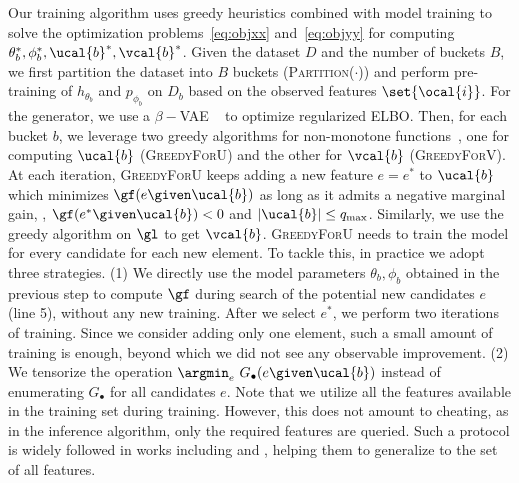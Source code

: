 \documentclass[letterpaper]{article}
\renewcommand{\cite}{\citep}
\begin{document}

Our training algorithm uses greedy heuristics combined with model training to solve the optimization problems~\eqref{eq:objxx} and~\eqref{eq:objyy} for computing $\theta_b ^*, \phi_b ^*, \ucal{b} ^*, \vcal{b}^*$. Given the dataset $D$ and the number of buckets $B$, we first partition the dataset into $B$ buckets (\textsc{Partition}($\cdot$)) and perform pre-training of $h_{\theta_b}$ and $p_{\phi_b}$ 
on $D_b$ based on the observed features $\set{\ocal{i}}$. For the generator, we use a $\beta-$VAE ~\cite{higgins2017beta} to optimize regularized ELBO.
Then, for each bucket $b$, we leverage two greedy algorithms for non-monotone functions~\cite{mualem2022using,harshaw2019submodular},  one for computing $\ucal{b}$ (\textsc{GreedyForU}) and the other for $\vcal{b}$ (\textsc{GreedyForV}). At each iteration, \textsc{GreedyForU} keeps adding a new feature $e=e^*$ to $\ucal{b}$ which minimizes $\gf(e\given\ucal{b})$ as long as it admits a negative marginal gain, \ie, $\gf( e^* \given \ucal{b})< 0$ and $|\ucal{b}| \le q_{\max}$. Similarly, we use the greedy algorithm on $\gl$ to get $\vcal{b}$. \textsc{GreedyForU} needs to train the model for every candidate for each new element. To tackle this, in practice we adopt three strategies. (1) We directly use the model parameters $\theta_b , \phi_b $ obtained in the previous step  to compute $\gf$ during search of the potential new candidates $e$ (line 5), without any new training. After we select $e^*$, we perform two iterations of training. Since we consider adding only one element, such a small amount of training is enough, beyond which we did not see any observable improvement.
(2) We tensorize the operation $\argmin_e \ G_{\bullet}(e\given\ucal{b})$ instead of enumerating $G_{\bullet}$ for all candidates $e$. Note that we utilize all the features available in the training set during training. However, this does not amount to cheating, as in the inference algorithm, only the required features are queried. Such a protocol is widely followed in works including \cite{acflow} and \cite{eddi}, helping them to generalize to the set of all features.
   
\end{document}
